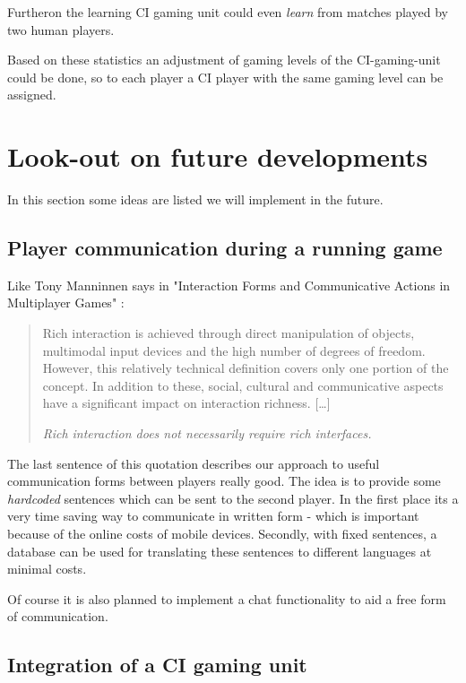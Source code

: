 		Furtheron the learning CI gaming unit could even \textit{learn} from
		matches played by two human players.

		Based on these statistics an adjustment of gaming levels of the
		CI-gaming-unit could be done, so to each player a CI player with the
		same gaming level can be assigned.


\section{Look-out on future developments}

	In this section some ideas are listed we will implement in the future.

	\subsection{Player communication during a running game}

		Like Tony Manninnen says in "Interaction Forms and Communicative Actions
		in Multiplayer Games" \cite{mann03}:

		\begin{quotation}

			Rich interaction is achieved through direct manipulation of objects,
			multimodal input devices and the high number of degrees of freedom.
			However, this relatively technical definition covers only one
			portion of the concept. In addition to these, social, cultural and
			communicative aspects have a significant impact on interaction
			richness. [\ldots]

			\textit{Rich interaction does not necessarily require rich
			interfaces.}

		\end{quotation}

		The last sentence of this quotation describes our approach to useful
		communication forms between players really good. The idea is to provide
		some \emph{hardcoded} sentences which can be sent to the second player.
		In the first place its a very time saving way to communicate in written
		form - which is important because of the online costs of mobile devices.
		Secondly, with fixed sentences, a database can be used for translating
		these sentences to different languages at minimal costs.

		Of course it is also planned to implement a chat functionality to aid a
		free form of communication.

	\subsection{Integration of a CI gaming unit}

